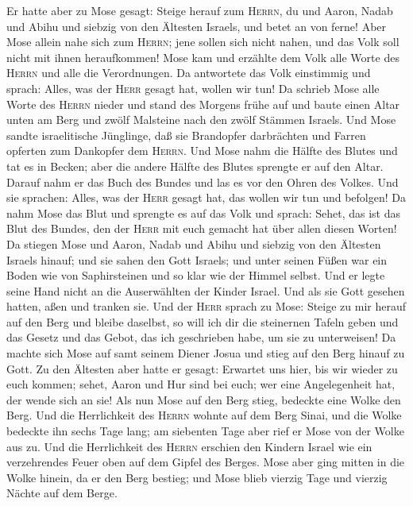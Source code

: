  Er hatte aber zu Mose gesagt: Steige herauf zum
\textsc{Herrn}, du und Aaron, Nadab und Abihu und siebzig von den
Ältesten Israels, und betet an von ferne!  Aber Mose
allein nahe sich zum \textsc{Herrn}; jene sollen sich nicht nahen, und
das Volk soll nicht mit ihnen heraufkommen!  Mose kam und
erzählte dem Volk alle Worte des \textsc{Herrn} und alle die
Verordnungen. Da antwortete das Volk einstimmig und sprach: Alles, was
der \textsc{Herr} gesagt hat, wollen wir tun!  Da schrieb
Mose alle Worte des \textsc{Herrn} nieder und stand des Morgens frühe
auf und baute einen Altar unten am Berg und zwölf Malsteine nach den
zwölf Stämmen Israels.  Und Mose sandte israelitische
Jünglinge, daß sie Brandopfer darbrächten und Farren opferten zum
Dankopfer dem \textsc{Herrn}.  Und Mose nahm die Hälfte
des Blutes und tat es in Becken; aber die andere Hälfte des Blutes
sprengte er auf den Altar.  Darauf nahm er das Buch des
Bundes und las es vor den Ohren des Volkes. Und sie sprachen: Alles, was
der \textsc{Herr} gesagt hat, das wollen wir tun und befolgen!
 Da nahm Mose das Blut und sprengte es auf das Volk und
sprach: Sehet, das ist das Blut des Bundes, den der \textsc{Herr} mit
euch gemacht hat über allen diesen Worten!  Da stiegen
Mose und Aaron, Nadab und Abihu und siebzig von den Ältesten Israels
hinauf;  und sie sahen den Gott Israels; und unter seinen
Füßen war ein Boden wie von Saphirsteinen und so klar wie der Himmel
selbst.  Und er legte seine Hand nicht an die
Auserwählten der Kinder Israel. Und als sie Gott gesehen hatten, aßen
und tranken sie.  Und der \textsc{Herr} sprach zu Mose:
Steige zu mir herauf auf den Berg und bleibe daselbst, so will ich dir
die steinernen Tafeln geben und das Gesetz und das Gebot, das ich
geschrieben habe, um sie zu unterweisen!  Da machte sich
Mose auf samt seinem Diener Josua und stieg auf den Berg hinauf zu Gott.
 Zu den Ältesten aber hatte er gesagt: Erwartet uns hier,
bis wir wieder zu euch kommen; sehet, Aaron und Hur sind bei euch; wer
eine Angelegenheit hat, der wende sich an sie!  Als nun
Mose auf den Berg stieg, bedeckte eine Wolke den Berg. 
Und die Herrlichkeit des \textsc{Herrn} wohnte auf dem Berg Sinai, und
die Wolke bedeckte ihn sechs Tage lang; am siebenten Tage aber rief er
Mose von der Wolke aus zu.  Und die Herrlichkeit des
\textsc{Herrn} erschien den Kindern Israel wie ein verzehrendes Feuer
oben auf dem Gipfel des Berges.  Mose aber ging mitten in
die Wolke hinein, da er den Berg bestieg; und Mose blieb vierzig Tage
und vierzig Nächte auf dem Berge.

